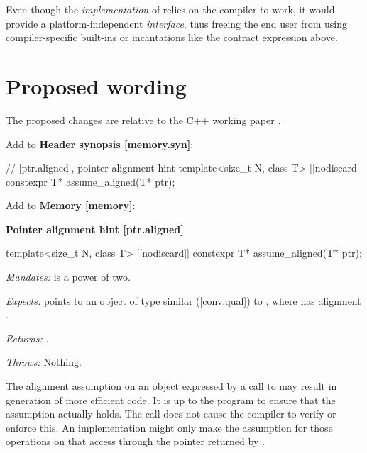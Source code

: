 Even though the \emph{implementation} of  relies on the compiler to work, it would provide a platform-independent \emph{interface}, thus freeing the end user from using compiler-specific built-ins or incantations like the contract expression above.

\pagebreak 
\section{Proposed wording}

The proposed changes are relative to the C++ working paper \cite{Smith2018}. 

Add to \textbf{Header  synopsis [memory.syn]}:

\begin{addedblock}
\begin{codeblock}
// [ptr.aligned], pointer alignment hint
template<size_t N, class T>
  [[nodiscard]] constexpr T* assume_aligned(T* ptr);
\end{codeblock}
\end{addedblock}


Add to \textbf{Memory [memory]}:

\begin{addedblock}
\textbf{Pointer alignment hint \hspace{97mm}[ptr.aligned]}

\begin{codeblock}
template<size_t N, class T> [[nodiscard]] constexpr T* assume_aligned(T* ptr);
\end{codeblock}

\emph{Mandates:}  is a power of two.

\emph{Expects:}  points to an object  of type similar ([conv.qual]) to , where  has alignment .

\emph{Returns:} .

\emph{Throws:} Nothing.

\begin{note}
The alignment assumption on an object  expressed by a call to  may result in generation of more efficient code. It is up to the program to ensure that the assumption actually holds. The call does not cause the compiler to verify or enforce this. An implementation might only make the assumption for those operations on  that access  through the pointer returned by .
\end{note}
\end{addedblock}


